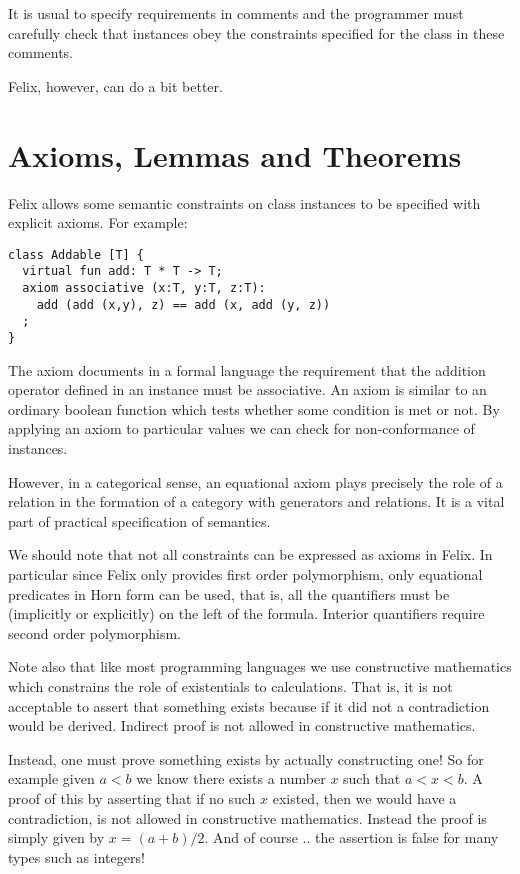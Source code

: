 \documentclass[oneside]{book}
\begin{document}
It is usual to specify requirements in comments and
the programmer must carefully check that instances
obey the constraints specified for the class in these
comments.

Felix, however, can do a bit better.

\section{Axioms, Lemmas and Theorems}
Felix allows some semantic constraints on class instances
to be specified with explicit axioms. For example:

\begin{verbatim}
class Addable [T] {
  virtual fun add: T * T -> T;
  axiom associative (x:T, y:T, z:T):
    add (add (x,y), z) == add (x, add (y, z))
  ;
}
\end{verbatim}

The axiom documents in a formal language the requirement
that the addition operator defined in an instance
must be associative. An axiom is similar to an ordinary
boolean function which tests whether some condition is
met or not. By applying an axiom to particular values
we can check for non-conformance of instances.

However, in a categorical sense, an equational axiom
plays precisely the role of a relation in the formation
of a category with generators and relations. It is a vital
part of practical specification of semantics.

We should note that not all constraints can be expressed
as axioms in Felix. In particular since Felix only provides
first order polymorphism, only equational predicates
in Horn form can be used, that is, all the quantifiers
must be (implicitly or explicitly) on the left of the formula.
Interior quantifiers require second order polymorphism.

Note also that like most programming languages we use
constructive mathematics which constrains the role
of existentials to calculations. That is, it is not
acceptable to assert that something exists because
if it did not a contradiction would be derived.
Indirect proof is not allowed in constructive mathematics.

Instead, one must prove something exists by actually 
constructing one! So for example given $a < b$ we
know there exists a number $x$ such that $a < x < b$.
A proof of this by asserting that if no such $x$
existed, then we would have a contradiction, is
not allowed in constructive mathematics. Instead
the proof is simply given by $x = (a + b) / 2$.
And of course .. the assertion is false for many types
such as integers!
\end{document}
